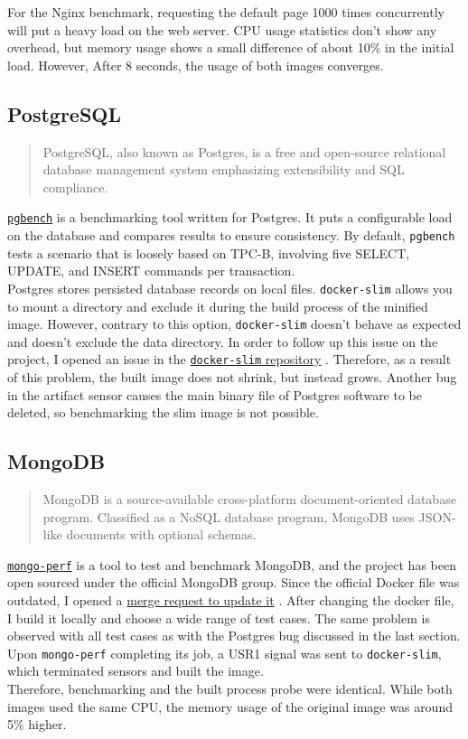 \documentclass[10pt]{article}
\begin{document}

For the Nginx benchmark, requesting the default page 1000 times concurrently will put a heavy load on the web server. CPU usage statistics don't show any overhead, but memory usage shows a small difference of about 10\% in the initial load. However, After 8 seconds, the usage of both images converges.

\subsection{PostgreSQL}
\begin{quote}
    PostgreSQL, also known as Postgres, is a free and open-source relational database management system emphasizing extensibility and SQL compliance.
\end{quote}
\href{https://www.postgresql.org/docs/current/pgbench.html}{\tt pgbench}
is a benchmarking tool written for Postgres. It puts a configurable load on the database and compares results to ensure consistency. By default, {\tt pgbench} tests a scenario that is loosely based on TPC-B, involving five SELECT, UPDATE, and INSERT commands per transaction.\\
Postgres stores persisted database records on local files. {\tt docker-slim} allows you to mount a directory and exclude it during the build process of the minified image. However, contrary to this option, {\tt docker-slim} doesn't behave as expected and doesn't exclude the data directory. In order to follow up this issue on the project, I opened an issue in the 
\href{https://github.com/docker-slim/docker-slim/issues/331}{{\tt docker-slim} repository}
. Therefore, as a result of this problem, the built image does not shrink, but instead grows. Another bug in the artifact sensor causes the main binary file of Postgres software to be deleted, so benchmarking the slim image is not possible.

\subsection{MongoDB}
\begin{quote}
    MongoDB is a source-available cross-platform document-oriented database program. Classified as a NoSQL database program, MongoDB uses JSON-like documents with optional schemas.
\end{quote}
\href{https://github.com/mongodb/mongo-perf}{\tt mongo-perf}
is a tool to test and benchmark MongoDB, and the project has been open sourced under the official MongoDB group. Since the official Docker file was outdated, I opened a
\href{https://github.com/mongodb/mchoose an ongo-perf/pull/98}{merge request to update it}
. After changing the docker file, I build it locally and choose a wide range of test cases. The same problem is observed with all test cases as with the Postgres bug discussed in the last section. Upon {\tt mongo-perf} completing its job, a USR1 signal was sent to {\tt docker-slim}, which terminated sensors and built the image.\\
Therefore, benchmarking and the built process probe were identical. While both images used the same CPU, the memory usage of the original image was around 5\% higher.

\end{document}
